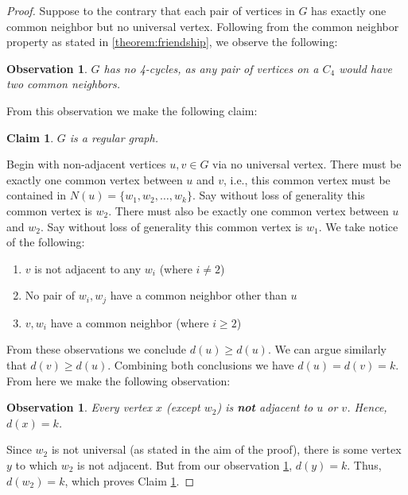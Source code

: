 \documentclass{article}
\newtheorem{observation}[theorem]{Observation}
\newtheorem{claim}[theorem]{Claim}
\begin{document}
\begin{proof}
\label{proof:friendship_theorem}
Suppose to the contrary that each pair of vertices in $G$ has exactly one common neighbor but no universal vertex. Following from the common neighbor property as stated in \ref{theorem:friendship}, we observe the following:

\begin{observation}
$G$ has no 4-cycles, as any pair of vertices on a $C_4$ would have two common neighbors. 
\end{observation}

From this observation we make the following claim:

\begin{claim}
\label{claim:regularity}
$G$ is a regular graph.
\end{claim}

Begin with non-adjacent vertices $u, v \in G$ via no universal vertex. There must be exactly one common vertex between $u$ and $v$, i.e., this common vertex must be contained in $N(u) = \{w_1, w_2, \dots , w_k\}$. Say without loss of generality this common vertex is $w_2$. There must also be exactly one common vertex between $u$ and $w_2$. Say without loss of generality this common vertex is $w_1$. We take notice of the following:

\begin{enumerate}
    \item $v$ is not adjacent to any $w_i$ (where $i \neq 2$)
    \item No pair of $w_i, w_j$ have a common neighbor other than $u$
    \item $v, w_i$ have a common neighbor (where $ i \geq 2$)
\end{enumerate}

From these observations we conclude $d(u) \geq d(u)$. We can argue similarly that $d(v) \geq d(u)$. Combining both conclusions we have $d(u) = d(v) = k$. From here we make the following observation:

\begin{observation}
\label{obs:adjacency}
Every vertex $x$ (except $w_2$) is \textbf{not} adjacent to $u$ or $v$. Hence, $d(x) = k$.
\end{observation}  

Since $w_2$ is not universal (as stated in the aim of the proof), there is some vertex $y$ to which $w_2$ is not adjacent. But from our observation \ref{obs:adjacency}, $d(y) = k$. Thus, $d(w_2) = k$, which proves Claim \ref{claim:regularity}. 


\end{proof}
\end{document}
